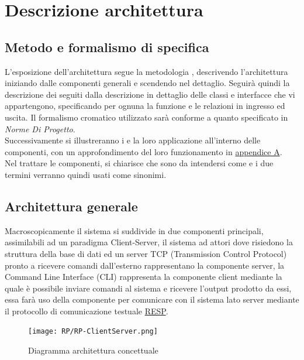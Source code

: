 \documentclass{scalatekids-article}
\begin{document}
\section{Descrizione architettura}

\subsection{Metodo e formalismo di specifica}

L'esposizione dell'architettura segue la metodologia ,
descrivendo l'architettura iniziando dalle componenti generali e scendendo
nel dettaglio. Seguirà quindi la descrizione dei  seguiti dalla descrizione
in dettaglio delle classi e interfacce che vi appartengono, specificando
per ognuna la funzione e le relazioni in ingresso ed uscita. Il formalismo
cromatico utilizzato sarà conforme a quanto specificato in \textit{Norme Di Progetto}.\\
Successivamente si illustreranno i  e la loro applicazione
all'interno delle componenti, con un approfondimento del loro funzionamento
in \hyperref[sec:appendice]{appendice A}.\\
Nel trattare le componenti, si chiarisce che sono da intendersi come 
e i due termini verranno quindi usati come sinonimi.\\

\subsection{Architettura generale}

Macroscopicamente il sistema si suddivide in due componenti principali,
assimilabili ad un paradigma Client-Server, il sistema ad attori dove risiedono
la struttura della base di dati ed un server TCP (Transmission Control Protocol)
pronto a ricevere comandi dall'esterno rappresentano la componente server, la
Command Line Interface (CLI) rappresenta la componente client mediante la quale
è possibile inviare comandi al sistema e ricevere l'output prodotto da essi,
essa farà uso della componente  per comunicare con il sistema lato
server mediante il protocollo di comunicazione testuale \hyperref[sec:RESP]{RESP}.\\

\begin{figure}[H]
  \begin{center}
    \texttt{[image: RP/RP-ClientServer.png]}
    \caption{Diagramma architettura concettuale}
  \end{center}
\end{figure}
\end{document}
